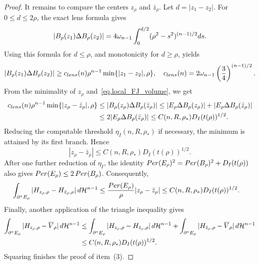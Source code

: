 \documentclass[10pt,a4paper]{amsart}
\newcommand\Per{\mathop{\rm Per}}
\newcommand{\dHn}{\,\dd\mathcal{H}^{n-1}}
\def\dd{{\rm d}}
\begin{document}
\begin{proof}
It remains to compare the centers $z_\rho$ and $\bar z_\rho$. Let
$d=|z_1-z_2|$. For $0\le d\le2\rho$, the exact lens formula gives
\[
 |B_\rho(z_1)\Delta B_\rho(z_2)|
 =4\omega_{n-1}\int_0^{d/2}(\rho^2-s^2)^{(n-1)/2}\dd s.
\]
Using this formula for $d\le\rho$, and monotonicity for $d\ge\rho$, yields
\begin{equation}\label{eq.lens_lower_bound}
 |B_\rho(z_1)\Delta B_\rho(z_2)|
 \ge c_{\rm lens}(n)\rho^{n-1}\min\{|z_1-z_2|,\rho\},
 \quad
 c_{\rm lens}(n)=2\omega_{n-1}\left(\frac34\right)^{(n-1)/2}.
\end{equation}
From the minimality of $z_\rho$ and~\eqref{eq.local_FJ_volume}, we get
\begin{align*}
 c_{\rm lens}(n)\rho^{n-1}
 \min\{|z_\rho-\bar z_\rho|,\rho\}
 &\le|B_\rho(z_\rho)\Delta B_\rho(\bar z_\rho)| 
 \le|E_\rho\Delta B_\rho(z_\rho)|
 +|E_\rho\Delta B_\rho(\bar z_\rho)|\\
 &\le2|E_\rho\Delta B_\rho(\bar z_\rho)| 
 \le C(n,R,\rho_*)D_I(t(\rho))^{1/2}.
\end{align*}
Reducing the computable threshold $\eta_I(n,R,\rho_*)$ if necessary, the
minimum is attained by its first branch. Hence
\[
 |z_\rho-\bar z_\rho|
 \le C(n,R,\rho_*)D_I(t(\rho))^{1/2}.
\]
After one further reduction of $\eta_I$, the identity
$\Per(E_\rho)^2=\Per(B_\rho)^2+D_I(t(\rho))$ also gives
$\Per(E_\rho)\le2\Per(B_\rho)$. Consequently,
\begin{align*}
 \int_{\partial^*E_\rho}
 |H_{z_\rho,\rho}-H_{\bar z_\rho,\rho}|\dHn
 &\le\frac{\Per(E_\rho)}{\rho}|z_\rho-\bar z_\rho| \le C(n,R,\rho_*)D_I(t(\rho))^{1/2}.
\end{align*}
Finally, another application of the triangle inequality gives
\begin{align*}
 \int_{\partial^*E_\rho}|H_{z_\rho,\rho}-\overline V_\rho|\dHn
 &\le\int_{\partial^*E_\rho}|H_{z_\rho,\rho}-H_{\bar z_\rho,\rho}|\dHn 
 +
 \int_{\partial^*E_\rho}|H_{\bar z_\rho,\rho}-\overline V_\rho|\dHn\\
 &\le C(n,R,\rho_*)D_I(t(\rho))^{1/2}.
\end{align*}
Squaring finishes the proof of item~(3).
\end{proof}
\end{document}
